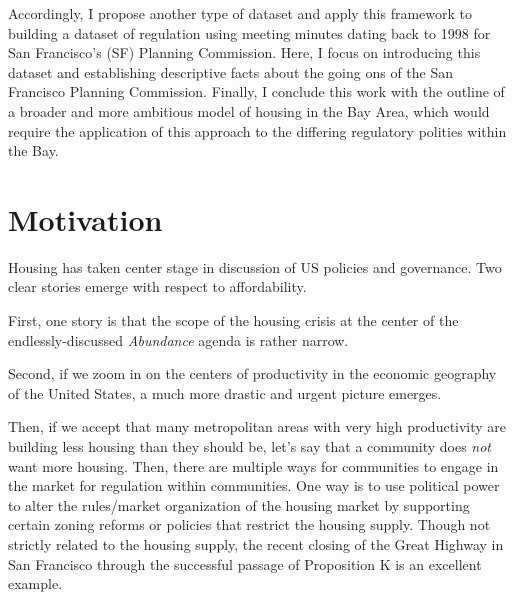 \documentclass{article}
\begin{document}
Accordingly, I propose another type of dataset and apply this framework to building a dataset of regulation using meeting minutes dating back to 1998 for San Francisco's (SF) Planning Commission. Here, I focus on introducing this dataset and establishing descriptive facts about the going ons of the San Francisco Planning Commission. Finally, I conclude this work with the outline of a broader and more ambitious model of housing in the Bay Area, which would require the application of this approach to the differing regulatory polities within the Bay.

\section{Motivation}

Housing has taken center stage in discussion of US policies and governance. Two clear stories emerge with respect to affordability. 

First, one story is that the scope of the housing crisis at the center of the endlessly-discussed \textit{Abundance} agenda is rather narrow. 

Second, if we zoom in on the centers of productivity in the economic geography of the United States, a much more drastic and urgent picture emerges. 

Then, if we accept that many metropolitan areas with very high productivity are building less housing than they should be, let's say that a community does \textit{not} want more housing. Then, there are multiple ways for communities to engage in the market for regulation within communities.  One way is to use political power to alter the rules/market organization of the housing market by supporting certain zoning reforms or policies that restrict the housing supply. Though not strictly related to the housing supply, the recent closing of the Great Highway in San Francisco through the successful passage of Proposition K is an excellent example.
\end{document}
